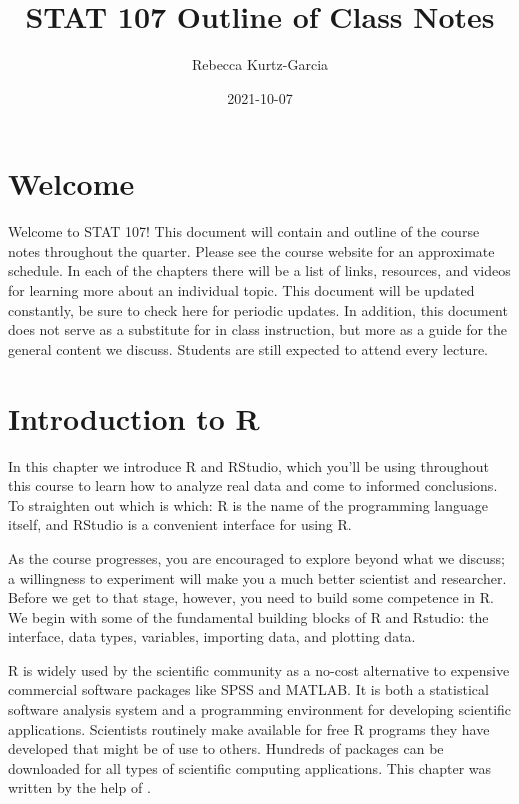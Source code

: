 \documentclass[
]{book}
\title{STAT 107 Outline of Class Notes}
\author{Rebecca Kurtz-Garcia}
\date{2021-10-07}
\begin{document}
\maketitle

{
\setcounter{tocdepth}{1}
\tableofcontents
}
\hypertarget{welcome}{%
\chapter*{Welcome}\label{welcome}}

Welcome to STAT 107! This document will contain and outline of the course notes throughout the quarter. Please see the course website for an approximate schedule. In each of the chapters there will be a list of links, resources, and videos for learning more about an individual topic. This document will be updated constantly, be sure to check here for periodic updates. In addition, this document does not serve as a substitute for in class instruction, but more as a guide for the general content we discuss. Students are still expected to attend every lecture.

\hypertarget{introduction-to-r}{%
\chapter{Introduction to R}\label{introduction-to-r}}

In this chapter we introduce R and RStudio, which you'll be using throughout this course to learn how to analyze real data and come to informed conclusions. To straighten out which is which: R is the name of the programming language itself, and RStudio is a convenient interface for using R.

As the course progresses, you are encouraged to explore beyond what we discuss; a willingness to experiment will make you a much better scientist and researcher. Before we get to that stage, however, you need to build some competence in R. We begin with some of the fundamental building blocks of R and Rstudio: the interface, data types, variables, importing data, and plotting data.

R is widely used by the scientific community as a no-cost alternative to expensive commercial software packages like SPSS and MATLAB. It is both a statistical software analysis system and a programming environment for developing scientific applications. Scientists routinely make available for free R programs they have developed that might be of use to others. Hundreds of packages can be downloaded for all types of scientific computing applications. This chapter was written by the help of \citet{Desharnais2020}.
\end{document}
